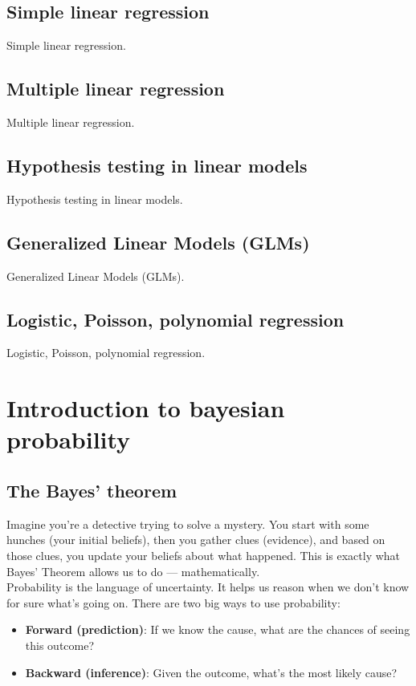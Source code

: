 \documentclass{book}
\begin{document}
\section{Simple linear regression}
Simple linear regression.

\newpage

\section{Multiple linear regression}
Multiple linear regression.

\newpage

\section{Hypothesis testing in linear models}
Hypothesis testing in linear models.

\newpage

\section{Generalized Linear Models (GLMs)}
Generalized Linear Models (GLMs).

\newpage

\section{Logistic, Poisson, polynomial regression}
Logistic, Poisson, polynomial regression.



\chapter{Introduction to bayesian probability}

\section{The Bayes' theorem}

Imagine you're a detective trying to solve a mystery. You start with some hunches (your initial beliefs), then you gather clues (evidence), and based on those clues, you update your beliefs about what happened. This is exactly what Bayes' Theorem allows us to do — mathematically.\\

Probability is the language of uncertainty. It helps us reason when we don’t know for sure what’s going on. There are two big ways to use probability:
\begin{itemize}
  \item \textbf{Forward (prediction)}: If we know the cause, what are the chances of seeing this outcome?
  \item \textbf{Backward (inference)}: Given the outcome, what’s the most likely cause?
\end{itemize}
\end{document}
